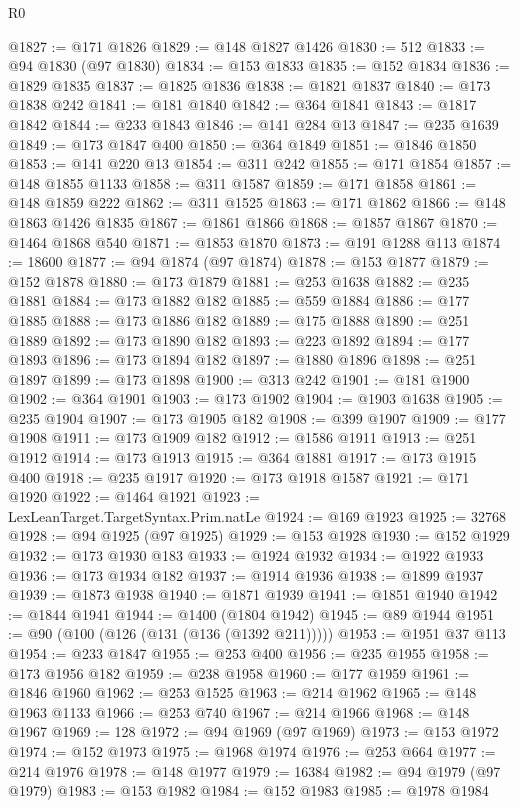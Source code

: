 \begin{lexlean}{R0}
\begin{coremodule}
@1827 := @171 @1826
@1829 := @148 @1827 @1426
@1830 := 512
@1833 := @94 @1830 (@97 @1830)
@1834 := @153 @1833
@1835 := @152 @1834
@1836 := @1829 @1835
@1837 := @1825 @1836
@1838 := @1821 @1837
@1840 := @173 @1838 @242
@1841 := @181 @1840
@1842 := @364 @1841
@1843 := @1817 @1842
@1844 := @233 @1843
@1846 := @141 @284 @13
@1847 := @235 @1639
@1849 := @173 @1847 @400
@1850 := @364 @1849
@1851 := @1846 @1850
@1853 := @141 @220 @13
@1854 := @311 @242
@1855 := @171 @1854
@1857 := @148 @1855 @1133
@1858 := @311 @1587
@1859 := @171 @1858
@1861 := @148 @1859 @222
@1862 := @311 @1525
@1863 := @171 @1862
@1866 := @148 @1863 @1426 @1835
@1867 := @1861 @1866
@1868 := @1857 @1867
@1870 := @1464 @1868 @540
@1871 := @1853 @1870
@1873 := @191 @1288 @113
@1874 := 18600
@1877 := @94 @1874 (@97 @1874)
@1878 := @153 @1877
@1879 := @152 @1878
@1880 := @173 @1879
@1881 := @253 @1638
@1882 := @235 @1881
@1884 := @173 @1882 @182
@1885 := @559 @1884
@1886 := @177 @1885
@1888 := @173 @1886 @182
@1889 := @175 @1888
@1890 := @251 @1889
@1892 := @173 @1890 @182
@1893 := @223 @1892
@1894 := @177 @1893
@1896 := @173 @1894 @182
@1897 := @1880 @1896
@1898 := @251 @1897
@1899 := @173 @1898
@1900 := @313 @242
@1901 := @181 @1900
@1902 := @364 @1901
@1903 := @173 @1902
@1904 := @1903 @1638
@1905 := @235 @1904
@1907 := @173 @1905 @182
@1908 := @399 @1907
@1909 := @177 @1908
@1911 := @173 @1909 @182
@1912 := @1586 @1911
@1913 := @251 @1912
@1914 := @173 @1913
@1915 := @364 @1881
@1917 := @173 @1915 @400
@1918 := @235 @1917
@1920 := @173 @1918 @1587
@1921 := @171 @1920
@1922 := @1464 @1921
@1923 := LexLeanTarget.TargetSyntax.Prim.natLe
@1924 := @169 @1923
@1925 := 32768
@1928 := @94 @1925 (@97 @1925)
@1929 := @153 @1928
@1930 := @152 @1929
@1932 := @173 @1930 @183
@1933 := @1924 @1932
@1934 := @1922 @1933
@1936 := @173 @1934 @182
@1937 := @1914 @1936
@1938 := @1899 @1937
@1939 := @1873 @1938
@1940 := @1871 @1939
@1941 := @1851 @1940
@1942 := @1844 @1941
@1944 := @1400 (@1804 @1942)
@1945 := @89 @1944
@1951 := @90 (@100 (@126 (@131 (@136 (@1392 @211)))))
@1953 := @1951 @37 @113
@1954 := @233 @1847
@1955 := @253 @400
@1956 := @235 @1955
@1958 := @173 @1956 @182
@1959 := @238 @1958
@1960 := @177 @1959
@1961 := @1846 @1960
@1962 := @253 @1525
@1963 := @214 @1962
@1965 := @148 @1963 @1133
@1966 := @253 @740
@1967 := @214 @1966
@1968 := @148 @1967
@1969 := 128
@1972 := @94 @1969 (@97 @1969)
@1973 := @153 @1972
@1974 := @152 @1973
@1975 := @1968 @1974
@1976 := @253 @664
@1977 := @214 @1976
@1978 := @148 @1977
@1979 := 16384
@1982 := @94 @1979 (@97 @1979)
@1983 := @153 @1982
@1984 := @152 @1983
@1985 := @1978 @1984

\end{coremodule}
\end{lexlean}
